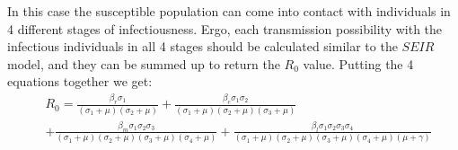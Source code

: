 In this case the susceptible population can come into contact with individuals in 4 different stages of infectiousness. Ergo, each transmission possibility with the infectious individuals in all 4 stages should be calculated similar to the $SEIR$ model, and they can be summed up to return the $R_0$ value. Putting the 4 equations together we get:
\begin{align*}
&R_0 = \frac{\beta_r \sigma_{1}}{{\left(\sigma_{1} + \mu\right)} {\left(\sigma_{2} + \mu\right)}} + \frac{\beta_e \sigma_{1} \sigma_{2}}{{\left(\sigma_{1} + \mu\right)} {\left(\sigma_{2} + \mu\right)} {\left(\sigma_{3} + \mu\right)}}\\ 
&+ \frac{\beta_m \sigma_{1} \sigma_{2} \sigma_{3}}{{\left(\sigma_{1} + \mu\right)} {\left(\sigma_{2} + \mu\right)} {\left(\sigma_{3} + \mu\right)} {\left(\sigma_{4} + \mu\right)}} + \frac{\beta_l \sigma_{1} \sigma_{2} \sigma_{3} \sigma_{4}}{{\left(\sigma_{1} + \mu\right)} {\left(\sigma_{2} + \mu\right)} {\left(\sigma_{3} + \mu\right)} {\left(\sigma_{4} + \mu\right)} {\left(\mu + \gamma\right)}}
\end{align*}
